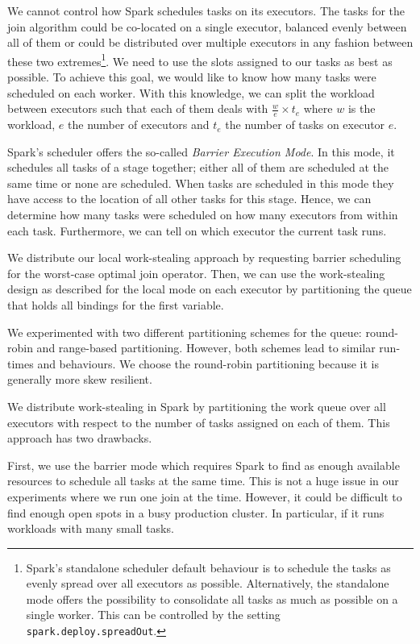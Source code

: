 We cannot control how Spark schedules tasks on its executors.
The tasks for the join algorithm could be co-located on a single executor, balanced evenly between all of them or could be distributed
over multiple executors in any fashion between these two extremes\footnote{Spark's standalone scheduler default behaviour is to schedule
the tasks as evenly spread over all executors as possible.
Alternatively, the standalone mode offers the possibility to consolidate all tasks as much as possible on a single worker.
This can be controlled by the setting \texttt{spark.deploy.spreadOut}.}.
We need to use the slots assigned to our tasks as best as possible.
To achieve this goal, we would like to know how many tasks were scheduled on each worker.
With this knowledge, we can split the workload between executors such that each of them deals with $\frac{w}{e} \times t_e$
where $w$ is the workload, $e$ the number of executors and $t_e$ the number of tasks on executor $e$.

Spark's scheduler offers the so-called \textit{Barrier Execution Mode}.
In this mode, it schedules all tasks of a stage together; either all of them are scheduled at the same time or
none are scheduled.
When tasks are scheduled in this mode they have access to the location of all other tasks for this stage.
Hence, we can determine how many tasks were scheduled on how many executors from within each task.
Furthermore, we can tell on which executor the current task runs.

We distribute our local work-stealing approach by requesting barrier scheduling for the worst-case optimal join
operator.
Then, we can use the work-stealing design as described for the local mode on each executor by partitioning the
queue that holds all bindings for the first variable.

We experimented with two different partitioning schemes for the queue: round-robin and range-based partitioning.
However, both schemes lead to similar run-times and behaviours.
We choose the round-robin partitioning because it is generally more skew resilient.

We distribute work-stealing in Spark by partitioning the work queue over all executors with respect to the
number of tasks assigned on each of them.
This approach has two drawbacks.

First, we use the barrier mode which requires Spark to find as enough available resources to schedule all tasks at the same time.
This is not a huge issue in our experiments where we run one join at the time.
However, it could be difficult to find enough open spots in a busy production cluster.
In particular, if it runs workloads with many small tasks.

